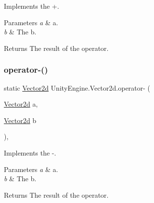 Implements the +. 


\begin{DoxyParams}{Parameters}
{\em a} & a.\\
\hline
{\em b} & The b.\\
\hline
\end{DoxyParams}
\begin{DoxyReturn}{Returns}
The result of the operator.
\end{DoxyReturn}
\mbox{\label{struct_unity_engine_1_1_vector2d_a34dc57a98b71bd6c0fbb448a7c25a4f9}} 
\subsubsection{\texorpdfstring{operator-\/()}{operator-()}\hspace{0.1cm}{\footnotesize\ttfamily [1/2]}}
{\footnotesize\ttfamily static \hyperlink{struct_unity_engine_1_1_vector2d}{Vector2d} Unity\+Engine.\+Vector2d.\+operator-\/ (\begin{DoxyParamCaption}\item[{\hyperlink{struct_unity_engine_1_1_vector2d}{Vector2d}}]{a,  }\item[{\hyperlink{struct_unity_engine_1_1_vector2d}{Vector2d}}]{b }\end{DoxyParamCaption})\hspace{0.3cm}{\ttfamily [inline]}, {\ttfamily [static]}}



Implements the -\/. 


\begin{DoxyParams}{Parameters}
{\em a} & a.\\
\hline
{\em b} & The b.\\
\hline
\end{DoxyParams}
\begin{DoxyReturn}{Returns}
The result of the operator.
\end{DoxyReturn}
\mbox{\label{struct_unity_engine_1_1_vector2d_a58bb462629cca1164ebdae3f93fda17e}} 
